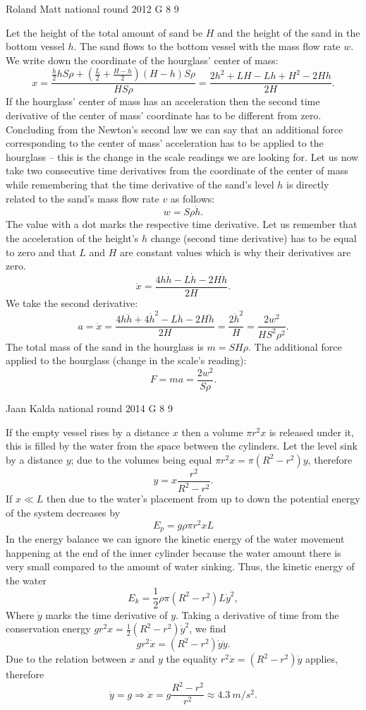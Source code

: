 \documentclass[11pt]{article}
\begin{document}
{Roland Matt} %
{national round} %
{2012} %
{G 8} %
{9} %
{

\ifEngSolution
Let the height of the total amount of sand be $H$ and the height of the sand in the bottom vessel $h$. The sand flows to the bottom vessel with the mass flow rate $w$.\\
We write down the coordinate of the hourglass’ center of mass:
\[x=\frac{\frac{h}{2}hS\rho+(\frac{L}{2}+\frac{H-h}{2})(H-h)S\rho}{HS\rho}=\frac{2h^2+LH-Lh+H^2-2Hh}{2H}.\] 
If the hourglass’ center of mass has an acceleration then the second time derivative of the center of mass’ coordinate has to be different from zero. Concluding from the Newton’s second law we can say that an additional force corresponding to the center of mass’ acceleration has to be applied to the hourglass – this is the change in the scale readings we are looking for. Let us now take two consecutive time derivatives from the coordinate of the center of mass while remembering that the time derivative of the sand’s level $h$ is directly related to the sand’s mass flow rate $v$ as follows:
\[w=S\rho\dot{h}.\] 
The value with a dot marks the respective time derivative. Let us remember that the acceleration of the height’s $h$ change (second time derivative) has to be equal to zero and that $L$ and $H$ are constant values which is why their derivatives are zero.
\[\dot{x}=\frac{4h\dot{h}-L\dot{h}-2H\dot{h}}{2H}.\] 
We take the second derivative:
\[a=\ddot{x}=\frac{4h\ddot{h}+4\dot{h}^2-L\ddot{h}-2H\ddot{h}}{2H}=\frac{2\dot{h}^2}{H}=\frac{2w^2}{HS^2\rho^2}.\] 
The total mass of the sand in the hourglass is $m=SH\rho$. The additional force applied to the hourglass (change in the scale’s reading):
\[F=ma=\frac{2w^2}{S\rho}.\]
\fi
}

{Jaan Kalda} %
{national round} %
{2014} %
{G 8} %
{9} %
{

\ifEngSolution
If the empty vessel rises by a distance $x$ then a volume $\pi r^2 x$ is released under it, this is filled by the water from the space between the cylinders. Let the level sink by a distance $y$; due to the volumes being equal $\pi r^2 x = \pi (R^2-r^2) y$, therefore
$$y=x\frac {r^2}{R^2-r^2}.$$
If $x\ll L$ then due to the water’s placement from up to down the potential energy of the system decreases by
$$E_p=g\rho \pi r^2 x L$$ 
In the energy balance we can ignore the kinetic energy of the water movement happening at the end of the inner cylinder because the water amount there is very small compared to the amount of water sinking. Thus, the kinetic energy of the water
$$E_k=\frac 12 \rho \pi (R^2-r^2) L\dot y^2,$$ 
Where $\dot y$ marks the time derivative of $y$. Taking a derivative of time from the conservation energy $gr^2x=\frac 12(R^2-r^2)\dot y^2$, we find
$$gr^2\dot x=(R^2-r^2)\dot y\ddot y.$$ 
Due to the relation between $x$ and $y$ the equality $r^2\dot x=(R^2-r^2)\dot
y$ applies, therefore
$$\ddot y = g\Rightarrow \ddot x = g\frac
{R^2-r^2}{r^2}\approx\SI{4,3}{m/s^2}.$$
\fi
}
\end{document}
